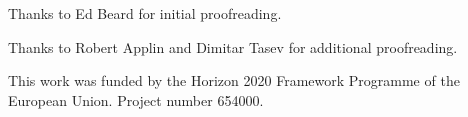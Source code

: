 \documentclass[jnr]{iosart2x}
\begin{document}
Thanks to Ed Beard for initial proofreading.

Thanks to Robert Applin and Dimitar Tasev for additional proofreading.

This work was funded by the Horizon 2020 Framework Programme of the European Union.
Project number 654000.



\nocite{*}


\end{document}
